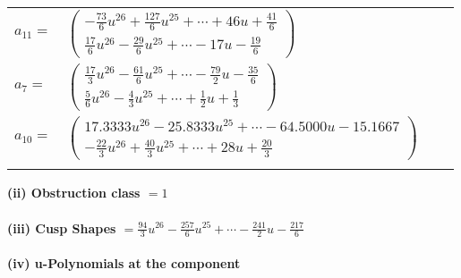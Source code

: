 \documentclass[1p]{elsarticle_modified}
\theoremstyle{definition}
\begin{document}
\begin{tabular}{m{7pt} m{180pt} m{7pt} m{180pt} }
\flushright $a_{11}=$&$\begin{pmatrix}-\frac{73}{6} u^{26}+\frac{127}{6} u^{25}+\cdots+46 u+\frac{41}{6}\\\frac{17}{6} u^{26}-\frac{29}{6} u^{25}+\cdots-17 u-\frac{19}{6}\end{pmatrix}$ \\
\flushright $a_{7}=$&$\begin{pmatrix}\frac{17}{3} u^{26}-\frac{61}{6} u^{25}+\cdots-\frac{79}{2} u-\frac{35}{6}\\\frac{5}{6} u^{26}-\frac{4}{3} u^{25}+\cdots+\frac{1}{2} u+\frac{1}{3}\end{pmatrix}$ \\
\flushright $a_{10}=$&$\begin{pmatrix}17.3333 u^{26}-25.8333 u^{25}+\cdots-64.5000 u-15.1667\\-\frac{22}{3} u^{26}+\frac{40}{3} u^{25}+\cdots+28 u+\frac{20}{3}\end{pmatrix}$\\&\end{tabular}
\flushleft \textbf{(ii) Obstruction class $= 1$}\\~\\
\flushleft \textbf{(iii) Cusp Shapes $= \frac{94}{3} u^{26}-\frac{257}{6} u^{25}+\cdots-\frac{241}{2} u-\frac{217}{6}$}\\~\\
\newpage\renewcommand{\arraystretch}{1}
\flushleft \textbf{(iv) u-Polynomials at the component}\newline \\
\end{document}
